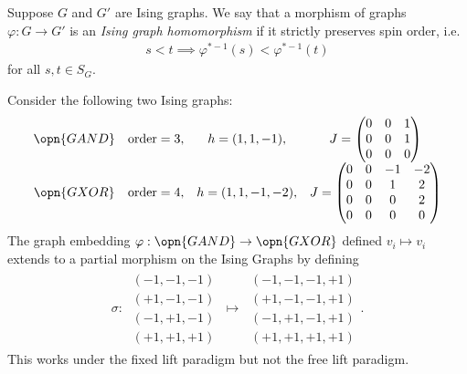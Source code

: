 \begin{defn}\label{defn:morphism-Ising-graphs}
	Suppose $G$ and $G'$ are Ising graphs. We say that a morphism of graphs $\varphi:G\to G'$ is an \emph{Ising graph homomorphism} if it strictly preserves spin order, i.e.
	\begin{align*}
		s < t \implies \varphi^{*-1}(s) < \varphi^{*-1}(t)
	\end{align*}
    for all $s,t \in S_{G}$.
\end{defn}
\begin{example}\label{example:GAND-to-GXOR}
	Consider the following two Ising graphs:
	\[
		\begin{array}{c c c c}
			\opn{GAND} & \text{order} = 3, & h = (1,1,-1), &J = \begin{pmatrix} 0 & 0 & 1 \\ 0 & 0 & 1 \\ 0 & 0 & 0 \end{pmatrix}  \\
			\opn{GXOR} & \text{order} = 4, & h = (1,1,-1,-2), & J = \begin{pmatrix} 0 & 0 & -1 & -2 \\ 0 & 0 & 1 & 2\\ 0 & 0 & 0 & 2 \\ 0 & 0 & 0 & 0 \end{pmatrix} \\
		\end{array}
	\]
	The graph embedding $\varphi:\opn{GAND} \to \opn{GXOR}$ defined $v_i \mapsto v_i$ extends to a partial morphism on the Ising Graphs by defining
	\begin{align*}
		\sigma:~
		\begin{array}{r}
			(-1,-1,-1) \\
			(+1,-1,-1) \\
			(-1,+1,-1) \\
			(+1,+1,+1)
		\end{array}~
		\longmapsto~
		\begin{array}{l}
			(-1,-1,-1,+1) \\
			(+1,-1,-1,+1) \\
			(-1,+1,-1,+1) \\
			(+1,+1,+1,+1)
		\end{array}.
	\end{align*}
	This works under the fixed lift paradigm but not the free lift paradigm.
\end{example}


